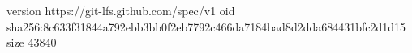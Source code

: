 version https://git-lfs.github.com/spec/v1
oid sha256:8c633f31844a792ebb3bb0f2eb7792c466da7184bad8d2dda684431bfc2d1d15
size 43840
